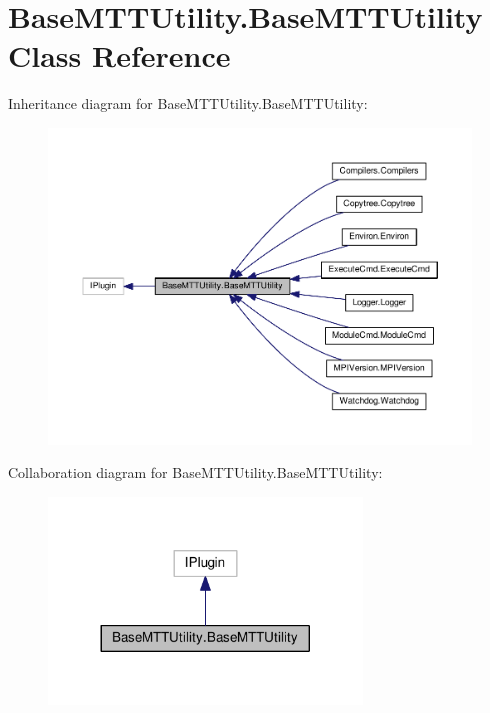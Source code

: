 \hypertarget{classBaseMTTUtility_1_1BaseMTTUtility}{\section{Base\-M\-T\-T\-Utility.\-Base\-M\-T\-T\-Utility Class Reference}
\label{classBaseMTTUtility_1_1BaseMTTUtility}
}


Inheritance diagram for Base\-M\-T\-T\-Utility.\-Base\-M\-T\-T\-Utility\-:
\nopagebreak
\begin{figure}[H]
\begin{center}
\leavevmode
\includegraphics[width=350pt]{classBaseMTTUtility_1_1BaseMTTUtility__inherit__graph}
\end{center}
\end{figure}


Collaboration diagram for Base\-M\-T\-T\-Utility.\-Base\-M\-T\-T\-Utility\-:
\nopagebreak
\begin{figure}[H]
\begin{center}
\leavevmode
\includegraphics[width=236pt]{classBaseMTTUtility_1_1BaseMTTUtility__coll__graph}
\end{center}
\end{figure}
